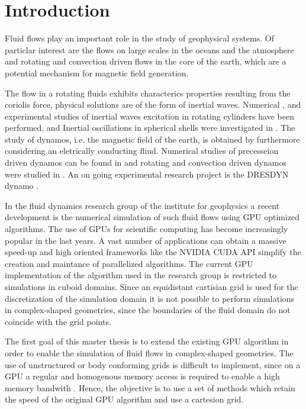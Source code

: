 \chapter*{Introduction}

Fluid flows play an important role in the study of geophysical systems.
Of particlar interest are the flows on large scales in the oceans
and the atmosphere and rotating and convection driven flows in the core of the earth, which are a potential mechanism
for magnetic field generation.

The flow in a rotating fluids exhibits characterics properties resulting from the coriolis force,
physical solutions are of the form of inertial waves.
Numerical \citep{Sauret2012}, \citep{Duguet} and experimental
studies \citep{QUOTE} of inertial waves excitation in rotating cylinders have been performed.
and Inertial oscillations in spherical shells were investigated in \citep{Tilgner1999}.
The study of dynamos, i.e. the magnetic field of the earth, is obtained by furthermore
considering an eletrically conducting fliud.
Numerical studies of precesseion driven dynamos can be found in \citep{Tilgner2005} and
rotating and convection driven dynamos were studied in \citep{Tilgner2012}.
An on going experimental research project is the DRESDYN dynamo \citep{Stefani2015}.

In the fluid dynamics research group of the institute for geophysics
a recent development is the numerical simulation of such fluid flows using GPU optimized algorithms.
The use of GPUs for scientific computing has become increasingly popular in the last years.
A vast number of applications  can obtain a massive speed-up and
high oriented frameworks like the NVIDIA CUDA API simplify the creation
and maintance of parallelized algorithms.
The current GPU implementation of the algorithm used in the research group is restricted
to simulations in cuboid domains.
Since an equidistant cartisian grid is used for the discretization of the simulation
domain it is not possible to perform simulations in complex-shaped geometries,
since the boundaries of the fluid domain  do not coincide with the grid points.

\bigbreak

The first goal of this master thesis is to extend the existing GPU algorithm
in order to enable the simulation of fluid flows in complex-shaped geometries.
The use of unstructured or body conforming grids is difficult to implement,
since on a GPU a regular and homogenous memory access is required to enable a high memory bandwith \citep{CUDABP}.
Hence, the objective is to use a set of methods which retain the speed of the original GPU algorithm and use a cartesion grid.


